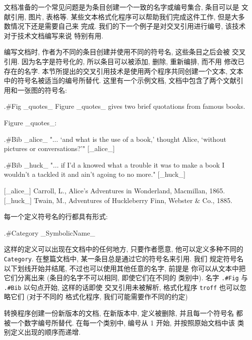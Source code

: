 文档准备的一个常见问题是为条目创建一个一致的名字或编号集合, 条目可以是
文献引用, 图片, 表格等.
某些文本格式化程序可以帮助我们完成这件工作, 但是大多数情况下还是需要自己来
完成. 我们的下一个例子是对交叉引用进行编号, 该技术对于技术文档编写来说
特别有用.

编写文档时, 作者为不同的条目创建并使用不同的符号名, 这些条目之后会被
交叉引用. 因为名字是符号化的, 所以条目可以被添加, 删除, 重新编排, 而不用
修改已存在的名字. 本节所提出的交叉引用技术是使用两个程序共同创建一个文本,
文本中的符号名被适当的编号所替代.
这里有一个示例文档, 文档中包含了两个文献引用和一张图的符号名:
\begin{awkcode}
    .#Fig _quotes_
    Figure _quotes_ gives two brief quotations from famous books.

                            Figure _quotes_:

    .#Bib _alice_
      "... `and what is the use of a book,' thought Alice,
      `without pictures or conversations?'" [_alice_]

    .#Bib _huck_
      "... if I'd a knowed what a trouble it was to make a book
      I wouldn't a tackled it and ain't agoing to no more." [_huck_]


    [_alice_] Carroll, L., Alice's Adventures in Wonderland,
        Macmillan, 1865.
    [_huck_] Twain, M., Adventures of Huckleberry Finn,
        Webster & Co., 1885.
\end{awkcode}
每一个定义符号名的行都具有形式:
\begin{awkcode}
    .#Category _SymbolicName_
\end{awkcode}
这样的定义可以出现在文档中的任何地方, 只要作者愿意, 他可以定义多种不同的
\texttt{Category}. 在整篇文档中, 某一条目总是通过它的符号名来引用. 我们 
规定符号名以下划线开始并结尾, 不过也可以使用其他任意的名字, 前提是
你可以从文本中把它们分离出来 (条目的名字不可以相同, 即使它们在不同的
类别中). 名字 \texttt{.\#Fig} 与 \texttt{.\#Bib} 以句点开始, 这样的话即使
交叉引用未被解析, 格式化程序 \texttt{troff} 也可以忽略它们 (对于不同的
格式化程序, 我们可能需要作不同的约定)

转换程序创建一份新版本的文档, 在新版本中, 定义被删除, 并且每一个符号名
都被一个数字编号所替代. 在每一个类别中, 编号从 1 开始, 并按照原始文档中该
类别定义出现的顺序而递增. 

